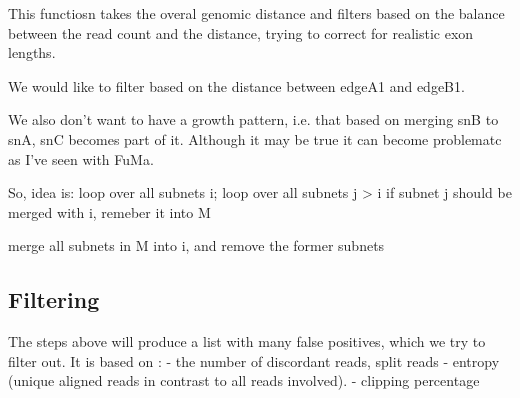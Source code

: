 \documentclass{article}
\theoremstyle{definition}
\begin{document}
This functiosn takes the overal genomic distance and filters based on the balance between the read count and the distance, trying to correct for realistic exon lengths.



        We would like to filter based on the distance between edgeA1 and
        edgeB1.
        
        We also don't want to have a growth pattern, i.e. that based on
        merging snB to snA, snC becomes part of it. Although it may be
        true it can become problematc as I've seen with FuMa.
        
        So, idea is:
        loop over all subnets i;
            loop over all subnets j > i
                if subnet j should be merged with i, remeber it into M
            
            merge all subnets in M into i, and remove the former subnets


\clearpage

\subsection{Filtering}
The steps above will produce a list with many false positives, which we try to filter out.
It is based on :
- the number of discordant reads, split reads
- entropy (unique aligned reads in contrast to all reads involved).
- clipping percentage
\end{document}
